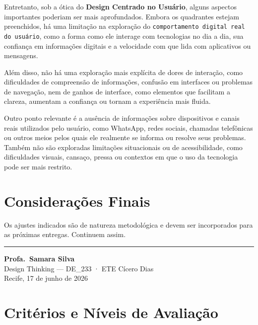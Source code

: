 \documentclass[
  sigconf,
  nonacm, %
  language=portuguese
]{acmart}
\begin{document}
Entretanto, sob a ótica do \textbf{Design Centrado no Usuário}, alguns aspectos importantes poderiam ser mais aprofundados. Embora os quadrantes estejam preenchidos, há uma limitação na exploração do \texttt{comportamento digital real do usuário}, como a forma como ele interage com tecnologias no dia a dia, sua confiança em informações digitais e a velocidade com que lida com aplicativos ou mensagens.

Além disso, não há uma exploração mais explícita de dores de interação, como dificuldades de compreensão de informações, confusão em interfaces ou problemas de navegação, nem de ganhos de interface, como elementos que facilitam a clareza, aumentam a confiança ou tornam a experiência mais fluida.

Outro ponto relevante é a ausência de informações sobre dispositivos e canais reais utilizados pelo usuário, como WhatsApp, redes sociais, chamadas telefônicas ou outros meios pelos quais ele realmente se informa ou resolve seus problemas. Também não são exploradas limitações situacionais ou de acessibilidade, como dificuldades visuais, cansaço, pressa ou contextos em que o uso da tecnologia pode ser mais restrito.

\section{Considerações Finais}

Os ajustes indicados são de natureza metodológica e devem ser
incorporados para as próximas entregas.
Continuem assim.


\vspace{1.5em}
\noindent\rule{\linewidth}{0.4pt}

\begin{flushright}
\textbf{Profa.\ Samara Silva}\\
{\small\color{cmuted} Design Thinking --- DE\_233 · ETE Cícero Dias}\\
{\small\color{cmuted} Recife, 17 de junho de 2026}
\end{flushright}


\appendix
\onecolumn
\section{Critérios e Níveis de Avaliação}
\end{document}
